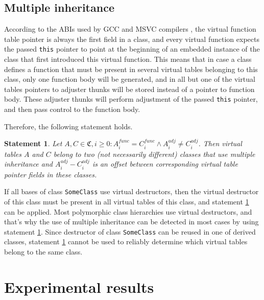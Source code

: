 \documentclass[times, 10pt,twocolumn]{article}
\newcommand{\gC}{\mathfrak{C}}
\newcommand{\func}{\textit{func}}
\newcommand{\adj}{\textit{adj}}
\newtheorem{statement}{Statement}
\begin{document}
\subsection{Multiple inheritance}

According to the ABIs used by GCC and MSVC compilers \cite{gccabi, gray94},
the virtual function table pointer is always the first field in a class,
and every virtual function expects the passed \lstinline{this} pointer
to point at the beginning of an embedded instance of the class
that first introduced this virtual function.
This means that in case a class defines a function that
must be present in several virtual tables belonging to this class,
only one function body will be generated,
and in all but one of the virtual tables pointers to adjuster thunks
will be stored instead of a pointer to function body.
These adjuster thunks will perform adjustment of the passed \lstinline{this}
pointer, and then pass control to the function body.

Therefore, the following statement holds.
\begin{statement}\label{stmt:multiple_inheritance}
Let $A, C \in \gC, i \ge 0: A_i^{\func} = C_i^{\func} \wedge A_i^{\adj} \ne C_i^{\adj}$.
Then virtual tables $A$ and $C$ belong to two (not necessarily different)
classes that use multiple inheritance and $A_i^{\adj} - C_i^{\adj}$
is an offset between corresponding virtual table pointer fields
in these classes.
\end{statement}

If all bases of class \lstinline{SomeClass} use virtual destructors, then the virtual destructor of this class must be present in all virtual tables of this class, and statement \ref{stmt:multiple_inheritance} can be applied. Most polymorphic class hierarchies use virtual destructors, and that's why the use of multiple inheritance can be detected in most cases by using statement \ref{stmt:multiple_inheritance}. Since destructor of class \lstinline{SomeClass} can be reused in one of derived classes, statement \ref{stmt:multiple_inheritance} cannot be used to reliably determine which virtual tables belong to the same class.

\section{Experimental results}
\label{sectionExperiments}
\end{document}
